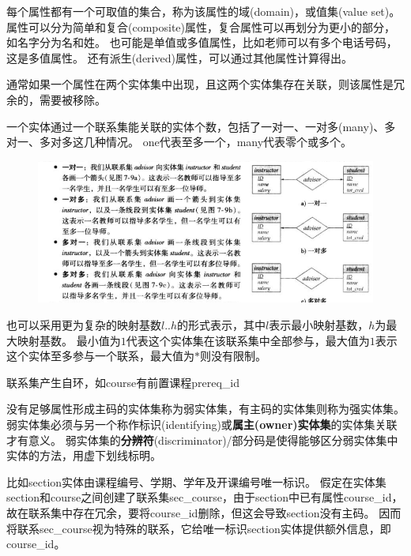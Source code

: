 \begin{definition}[属性]
每个属性都有一个可取值的集合，称为该属性的域(domain)，或值集(value set)。
属性可以分为简单和复合(composite)属性，复合属性可以再划分为更小的部分，如名字分为名和姓。
也可能是单值或多值属性，比如老师可以有多个电话号码，这是多值属性。
还有派生(derived)属性，可以通过其他属性计算得出。
\end{definition}
通常如果一个属性在两个实体集中出现，且这两个实体集存在关联，则该属性是冗余的，需要被移除。

\begin{definition}
一个实体通过一个联系集能关联的实体个数，包括了一对一、一对多(many)、多对一、多对多这几种情况。
one代表至多一个，many代表零个或多个。
\begin{figure}[H]
\centering
\includegraphics[width=\linewidth]{fig/mapping_radix.png}
\end{figure}
\end{definition}
也可以采用更为复杂的映射基数$l..h$的形式表示，其中$l$表示最小映射基数，$h$为最大映射基数。
最小值为$1$代表这个实体集在该联系集中全部参与，最大值为$1$表示这个实体至多参与一个联系，最大值为$*$则没有限制。

\begin{definition}[角色]
联系集产生自环，如course有前置课程prereq\_id
\end{definition}
\begin{definition}[强弱实体集]
没有足够属性形成主码的实体集称为弱实体集，有主码的实体集则称为强实体集。
弱实体集必须与另一个称作标识(identifying)或\textbf{属主(owner)实体集}的实体集关联才有意义。
弱实体集的\textbf{分辨符}(discriminator)/部分码是使得能够区分弱实体集中实体的方法，用虚下划线标明。
\end{definition}

比如section实体由课程编号、学期、学年及开课编号唯一标识。
假定在实体集section和course之间创建了联系集sec\_course，由于section中已有属性course\_id，故在联系集中存在冗余，要将course\_id删除，但这会导致section没有主码。
因而将联系sec\_course视为特殊的联系，它给唯一标识section实体提供额外信息，即course\_id。

